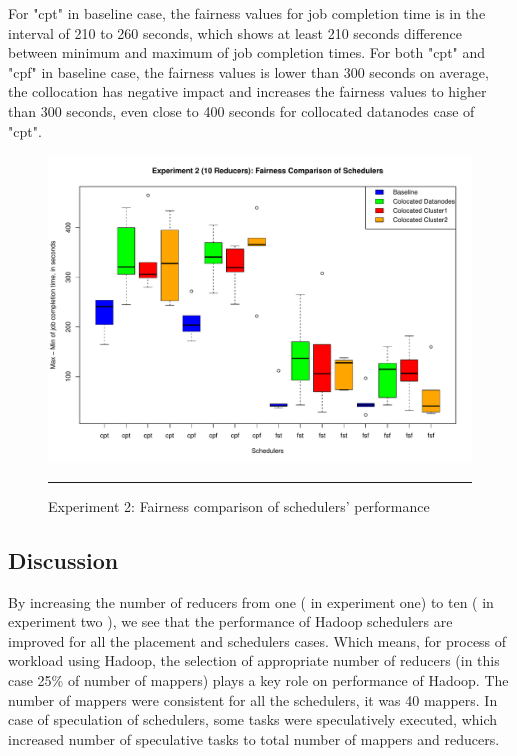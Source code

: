   For "cpt" in baseline case, the fairness values for job completion time is in the interval of 210 to 260 seconds, which shows at least 210 seconds difference between minimum and maximum of job completion times. For both "cpt" and "cpf" in baseline case, the fairness values is lower than 300 seconds on average, the collocation has negative impact and increases the fairness values to higher than 300 seconds,  even close to 400 seconds for collocated datanodes case of "cpt".\\
 
 
 \begin{figure}[htbp]
  \centering
    \includegraphics[width=\textwidth,height=\textheight,keepaspectratio]{./Figures/exp_2_max-min.pdf}
    \rule{35em}{0.5pt}
  \caption{Experiment 2: Fairness comparison of schedulers' performance }
  \label{fig:exp_2_max-min}
\end{figure} 
  

\subsection{Discussion}

By increasing the number of reducers from one ( in experiment one) to ten ( in experiment two ), we see that the performance of Hadoop schedulers are improved for all the placement and schedulers cases. Which means, for process of workload using Hadoop, the selection of appropriate number of reducers (in this case 25\% of number of mappers) plays a key role on performance of Hadoop. The number of mappers were consistent for all the schedulers, it was 40 mappers. In case of speculation of schedulers, some tasks were speculatively executed, which increased number of speculative tasks to total number of mappers and reducers. \\


